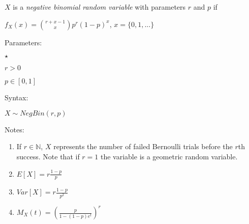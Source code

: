 \documentclass[12pt]{article}
\begin{document}
$X$ is a \emph{negative binomial random variable} with parameters $r$ and $p$ if\\
\par
$f_X(x) ={r+x-1 \choose x} p^r (1-p)^x$,     $x=\{0,1,...\}$	\\
\par
Parameters:\\
\par
\begin{list}{$\star$ }{}
\item $r > 0$
\item $p \in [0,1]$
\end{list}
\par
Syntax:\\
\par
$X\sim NegBin(r,p)$\\
\par
Notes:\\
\par
\begin{enumerate}

\item If $r \in \mathbb{N}$, $X$ represents the number of failed Bernoulli trials before the $r$th success. Note that if $r=1$ the variable is a geometric random variable.
\item $E[X] = r \frac{1-p}{p}$
\item $Var[X] = r \frac{1-p}{p^2}$
\item $M_X(t) = (\frac{p}{1 - (1-p)e^t})^r$

\end{enumerate}
\end{document}
